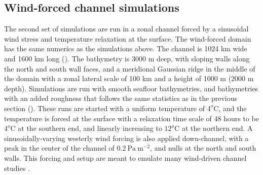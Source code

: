 \documentclass[twocol]{ametsocV5}
\begin{document}
\subsection{Wind-forced channel simulations}

The second set of simulations are run in a zonal channel forced by a sinusoidal wind stress and temperature relaxation at the surface.  The wind-forced domain has the same numerics as the simulations above.  The channel is 1024 km wide and 1600 km long ().  The bathymetry is 3000 m deep, with sloping walls along the north and south wall faces, and a meridional Gaussian ridge in the middle of the domain with a zonal lateral scale of 100 km and a height of 1000 m (2000 m depth).  Simulations are run with smooth seafloor bathymetries, and bathymetries with an added roughness that follows the same statistics as in the previous section ().  These runs are started with a uniform temperature of $4^o\mathrm{C}$, and the temperature is forced at the surface with a relaxation time scale of 48 hours to be $4^o\mathrm{C}$ at the southern end, and linearly increasing to $12^o\mathrm{C}$ at the northern end.  A sinusoidally-varying westerly wind forcing is also applied down-channel, with a peak in the center of the channel of $0.2\ \mathrm{Pa\ m^{-2}}$, and nulls at the north and south walls.  This forcing and setup are meant to emulate many wind-driven channel studies \citep[i.e.][]{abernatheycessi14, Marshall_2017}.
\end{document}
